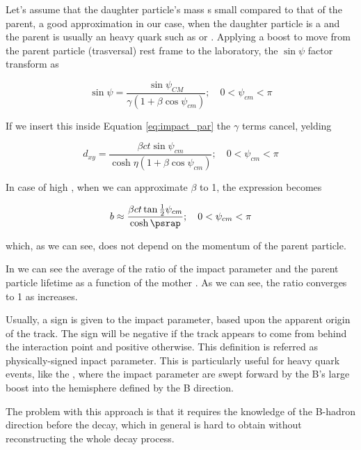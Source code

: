 Let's assume that the daughter particle's mass s small compared to that of the parent, a good approximation in our case, when the daughter particle is a \Pgm and the parent is usually an heavy quark such as \Pqc or \Pqb.
Applying a boost to move from the parent particle (trasversal) rest frame to the laboratory, the $\sin{\psi}$ factor transform as

\begin{equation}
	\sin{\psi}=\frac{\sin{\psi_{CM}}}{\gamma\left(1+\beta\cos{\psi_{cm}}\right)};\quad 0<\psi_{cm}<\pi
	\label{eq:sin_boost}
\end{equation}

If we insert this inside Equation \ref{eq:impact_par} the $\gamma$ terms cancel, yelding

\begin{equation}
	d_{xy} = \frac{\beta c t\sin{\psi_{cm}}}{\cosh{\eta}\left(1+\beta\cos{\psi_{cm}}\right)};\quad 0<\psi_{cm} < \pi
	\label{eq:impact_par_boosted}
\end{equation}

In case of high \pt, when we can approximate $\beta$ to 1, the expression becomes

\begin{equation}
	b\approx\frac{\beta c t\tan{\frac{1}{2}\psi_{cm}}}{\cosh{\psrap}};\quad 0<\psi_{cm} < \pi
	\label{eq:impact_par_boosted_highpt}
\end{equation}

which, as we can see, does not depend on the momentum of the parent particle.

In  we can see the average of the ratio of the impact parameter and the parent particle lifetime as a function of the mother \pt.
As we can see, the ratio converges to 1 as \pt increases.\\


Usually, a sign is given to the impact parameter, based upon the apparent origin of the track.
The sign will be negative if the track appears to come from behind the interaction point and positive otherwise. 
This definition is referred as physically-signed inpact parameter.
This is particularly useful for heavy quark events, like the \Pqb, where the impact parameter are swept forward by the B's large boost into the hemisphere defined by the B direction.

The problem with this approach is that it requires the knowledge of the B-hadron direction before the decay, which in general is hard to obtain without reconstructing the whole decay process.


